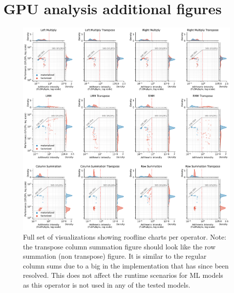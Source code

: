 \chapter{GPU analysis additional figures}
\label{appendix:analysis-additional-figures}
\begin{figure}[ht]
    \centering
    \includegraphics[width=1.0\textwidth]{appendices/figures/roofline-operators.pdf}
    \caption{Full set of visualizations showing roofline charts per operator. Note: the transpose column summation figure should look like the row summation (non transpose) figure. It is similar to the regular column sums due to a big in the implementation that has since been resolved. This does not affect the runtime scenarios for ML models as this operator is not used in any of the tested models.}
    \label{fig:additional-operator-rooflines}
\end{figure}
